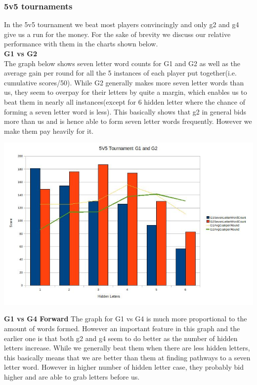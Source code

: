 \documentclass[11pt]{article}
\begin{document}
	\subsubsection{5v5 tournaments}
	In the 5v5 tournament we beat most players convincingly and only g2 and g4 give us a run for the money. For the sake of brevity we discuss our relative performance with them in the charts shown below.\\
	\textbf{G1 vs G2}\\
	The graph below shows seven letter word counts for G1 and G2 as well as the average gain per round for all the 5 instances of each player put together(i.e. cumulative scores/50). While G2 generally makes more seven letter words than us, they seem to overpay for their letters by quite a margin, which enables us to beat them in nearly all instances(except for 6 hidden letter where the chance of forming a seven letter word is less). This basically shows that g2 in general bids more than us and is hence able to form seven letter words frequently. However we make them pay heavily for it.
	\begin{center}
\includegraphics[width=1 \textwidth]{5v5option3G1G2}
\end{center}
	\textbf{G1 vs G4 Forward}
	The graph for G1 vs G4 is much more proportional to the amount of words formed. However an important feature in this graph and the earlier one is that both g2 and g4 seem to do better as the number of hidden letters increase. While we generally beat them when there are less hidden letters, this basically means that we are better than them at finding pathways to a seven letter word. However in higher number of hidden letter case, they probably bid higher and are able to grab letters before us.
\end{document}
